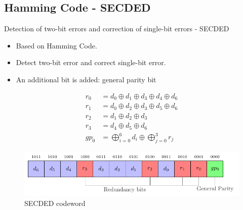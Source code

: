 \subsection{Hamming Code - SECDED}
\begin{frame}{Detection of two-bit errors and correction of single-bit errors - SECDED}
    \begin{block}{}
        \begin{itemize}
            \justifying
            \item Based on Hamming Code.
            \item Detect two-bit error and correct single-bit error.
            \item An additional bit is added: general parity bit
        \end{itemize}
    \end{block}

    \begin{minipage}[c]{0.4\linewidth}
        \begin{equation} \label{equat:secded_encoder}
            \begin{split}
                r_{0}  &= d_{0} \oplus d_{1} \oplus d_{3} \oplus d_{4} \oplus d_{6} \\
                r_{1}  &= d_{0} \oplus d_{2} \oplus d_{3} \oplus d_{5} \oplus d_{6} \\
                r_{2}  &= d_{1} \oplus d_{2} \oplus d_{3} \\
                r_{3}  &= d_{4} \oplus d_{5} \oplus d_{6} \\
                gp_{0} &= \bigoplus_{i=0}^{6} d_{i} \oplus \bigoplus_{j=0}^{3} r_{j}
            \end{split}
        \end{equation}
    \end{minipage}\hfill%
    \begin{minipage}[c]{0.6\linewidth}
        \begin{figure}
            \centering
            \includegraphics[width=\textwidth, page=1]{src/4_strategies/img/secded.pdf}
            \caption{SECDED codeword}
            \label{fig:secded_codeword}
        \end{figure}
    \end{minipage}
\end{frame}
    
